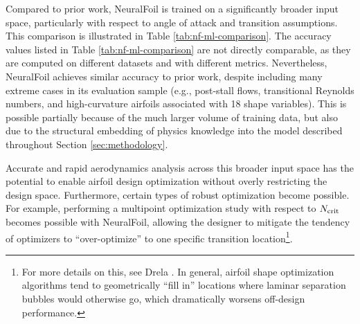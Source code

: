 Compared to prior work, NeuralFoil is trained on a significantly broader input space, particularly with respect to angle of attack and transition assumptions. This comparison is illustrated in Table \ref{tab:nf-ml-comparison}. The accuracy values listed in Table \ref{tab:nf-ml-comparison} are not directly comparable, as they are computed on different datasets and with different metrics. Nevertheless, NeuralFoil achieves similar accuracy to prior work, despite including many extreme cases in its evaluation sample (e.g., post-stall flows, transitional Reynolds numbers, and high-curvature airfoils associated with 18 shape variables). This is possible partially because of the much larger volume of training data, but also due to the structural embedding of physics knowledge into the model described throughout Section \ref{sec:methodology}.

Accurate and rapid aerodynamics analysis across this broader input space has the potential to enable airfoil design optimization without overly restricting the design space. Furthermore, certain types of robust optimization become possible. For example, performing a multipoint optimization study with respect to $N_{\rm crit}$ becomes possible with NeuralFoil, allowing the designer to mitigate the tendency of optimizers to ``over-optimize'' to one specific transition location\footnote{For more details on this, see Drela \cite{drela_pros_1998}. In general, airfoil shape optimization algorithms tend to geometrically ``fill in'' locations where laminar separation bubbles would otherwise go, which dramatically worsens off-design performance.}.


